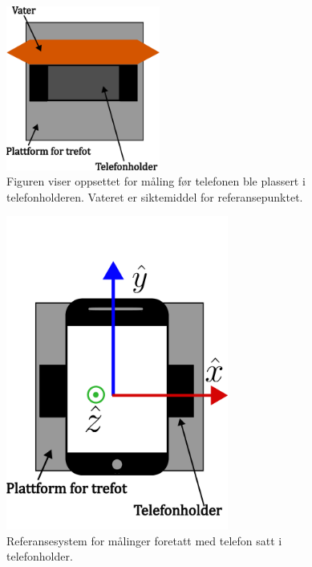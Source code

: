 \begin{figure}
    \centering
    \includegraphics[width=0.45\textwidth]{img/Plattform med vater.pdf}                 
    \caption{Figuren viser oppsettet for måling før telefonen ble plassert i telefonholderen. Vateret er siktemiddel for referansepunktet.}
    \label{fig:med_vater}
\end{figure}

\begin{figure}
    \centering
    \includegraphics[width=0.65\textwidth]{img/Plattform med telefoni.pdf}
    \caption{Referansesystem for målinger foretatt med telefon satt i telefonholder.}
    \label{fig:telf_akser}
\end{figure}